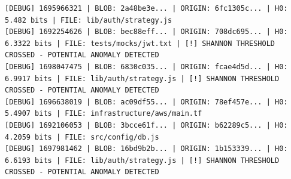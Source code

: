\documentclass[12pt, a4paper, oneside]{report}
\begin{document}
\begin{lstlisting}[basicstyle=\tiny\ttfamily]
[DEBUG] 1695966321 | BLOB: 2a48be3e... | ORIGIN: 6fc1305c... | H0: 5.482 bits | FILE: lib/auth/strategy.js
[DEBUG] 1692254626 | BLOB: bec88eff... | ORIGIN: 708dc695... | H0: 6.3322 bits | FILE: tests/mocks/jwt.txt | [!] SHANNON THRESHOLD CROSSED - POTENTIAL ANOMALY DETECTED
[DEBUG] 1698047475 | BLOB: 6830c035... | ORIGIN: fcae4d5d... | H0: 6.9917 bits | FILE: lib/auth/strategy.js | [!] SHANNON THRESHOLD CROSSED - POTENTIAL ANOMALY DETECTED
[DEBUG] 1696638019 | BLOB: ac09df55... | ORIGIN: 78ef457e... | H0: 5.4907 bits | FILE: infrastructure/aws/main.tf
[DEBUG] 1692106053 | BLOB: 3bcce61f... | ORIGIN: b62289c5... | H0: 4.2059 bits | FILE: src/config/db.js
[DEBUG] 1697981462 | BLOB: 16bd9b2b... | ORIGIN: 1b153339... | H0: 6.6193 bits | FILE: lib/auth/strategy.js | [!] SHANNON THRESHOLD CROSSED - POTENTIAL ANOMALY DETECTED
\end{lstlisting}
\newpage
\end{document}
